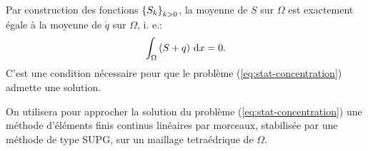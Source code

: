 \begin{remarque}
  Par construction des fonctions $\left\{ S_k \right\}_{k>0}$, la moyenne de $S$ sur
  $\Omega$ est exactement égale à la moyenne de $\dot q$ sur
  $\Omega$, i. e.:
  \begin{equation}
    \int_\Omega \left( S + q \right)\,\mathrm dx = 0.
  \end{equation}
  C'est une condition nécessaire pour que le problème
  (\ref{eq:stat-concentration}) admette une solution.
\end{remarque}

On utilisera pour approcher la solution du problème
(\ref{eq:stat-concentration}) une méthode d'éléments finis continus
linéaires par morceaux, stabilisée par une méthode de type SUPG, sur un
maillage tetraédrique de $\Omega$.
